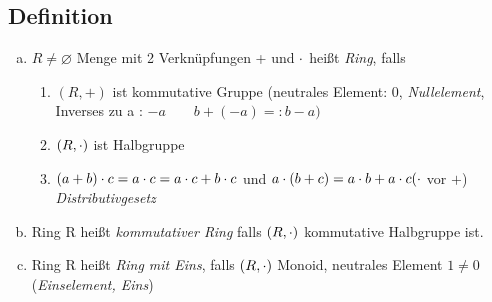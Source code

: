 \subsection{Definition}\label{sec:1.12}
\begin{enumerate}[a)]
\item$R \ne \varnothing$ Menge mit 2 Verknüpfungen + und $\cdot$ hei\ss t  \emph{Ring}, falls
\begin{enumerate}[(1)]
\item$ (R, +)$ ist kommutative Gruppe (neutrales Element: 0, \emph{Nullelement}, Inverses zu a : $-a\qquad b + (-a) =: b - a)$
\item $(R,\cdot)$ ist Halbgruppe
\item $(a+b) \cdot c = a \cdot c = a \cdot c + b \cdot c$ und $a \cd (b + c) = a \cd b + a \cd c \hfill (\cd $ vor $+$)\\
\emph{Distributivgesetz} 
\end{enumerate}
\item Ring R hei\ss t \emph{kommutativer Ring} falls $(R,\cdot)$ kommutative Halbgruppe ist.
\item Ring R hei\ss t {\em Ring mit Eins}, falls $(R, \cdot)$ Monoid, neutrales Element $1 \ne 0$ ({\em Einselement, Eins})
\end{enumerate}
